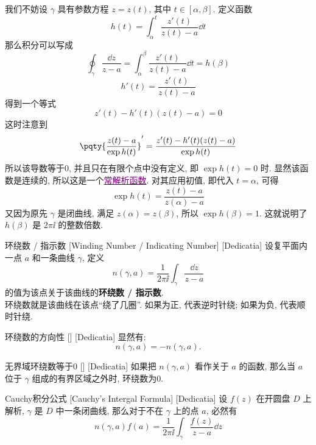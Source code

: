 \documentclass[UTF8]{ctexart}
\newcommand{\hyperrefc}[2]{\hyperref[#1]{\textcolor{purple}{#2}}}
\begin{document}
        \begin{prf}
            我们不妨设 \(\gamma\) 具有参数方程 \(z=z(t)\), 其中 \(t\in[\alpha,\beta]\). 定义函数
            \[h(t)=\int_\alpha^t \frac{z'(t)}{z(t)-a}\dd{t}\]
            那么积分可以写成
            \[\oint_\gamma\frac{\dd{z}}{z-a}=\int_\alpha^\beta \frac{z'(t)}{z(t)-a}\dd{t}=h(\beta)\]
            \[h'(t)=\frac{z'(t)}{z(t)-a}\]
            得到一个等式
            \[z'(t)-h'(t)(z(t)-a)=0\]
            这时注意到
            \[\pqty{\frac{z(t)-a}{\exp h(t)}}'=\frac{z'(t)-h'(t)(z(t)-a)}{\exp h(t)}\]
            所以该导数等于0, 并且只在有限个点中没有定义, 即 \(\exp h(t)=0\) 时. 显然该函数是连续的, 所以这是一个\hyperrefc{ppt:TrivialAnalyticalFunction}{常解析函数}. 对其应用初值, 即代入 \(t=\alpha\), 可得
            \[\exp h(t)=\frac{z(t)-a}{z(\alpha)-a}\]
            又因为原先 \(\gamma\) 是闭曲线, 满足 \(z(\alpha)=z(\beta)\), 所以 \(\exp h(\beta)=1\). 这就说明了 \(h(\beta)\) 是 \(2\pi\ii\) 的整数倍数. 
        \end{prf}

        \begin{dfn}
            [WindingNumber]
            {环绕数 / 指示数}
            [Winding Number / Indicating Number]
            [Dedicatia]
            设复平面内一点 \(a\) 和一条曲线 \(\gamma\), 定义
            \[n(\gamma, a)=\frac{1}{2\pi\ii}\int_\gamma\frac{\dd{z}}{z-a}\]
            的值为该点关于该曲线的\textbf{环绕数 / 指示数}.\\
            环绕数就是该曲线在该点“绕了几圈”. 如果为正, 代表逆时针绕; 如果为负, 代表顺时针绕. 
        \end{dfn}

        \begin{ppt}
            [UUID]
            {环绕数的方向性}
            []
            [Dedicatia]
            显然有: 
            \[n(\gamma,a)=-n(\gamma,a).\]
        \end{ppt}

        \begin{ppt}
            [UUID]
            {无界域环绕数等于0}
            []
            [Dedicatia]
            如果把 \(n(\gamma,a)\) 看作关于 \(a\) 的函数, 那么当 \(a\) 位于 \(\gamma\) 组成的有界区域之外时, 环绕数为0.
        \end{ppt}

        \begin{thm}
            [UUID]
            {Cauchy积分公式}
            [Cauchy's Intergal Formula]
            [Dedicatia]
            设 \(f(z)\) 在开圆盘 \(D\) 上解析,  \(\gamma\) 是 \(D\) 中一条闭曲线, 那么对于不在 \(\gamma\) 上的点 \(a\), 必然有
            \[n(\gamma,a)f(a)=\frac{1}{2\pi\ii}\int_\gamma\frac{f(z)}{z-a}\dd{z} \]
        \end{thm}
\end{document}
